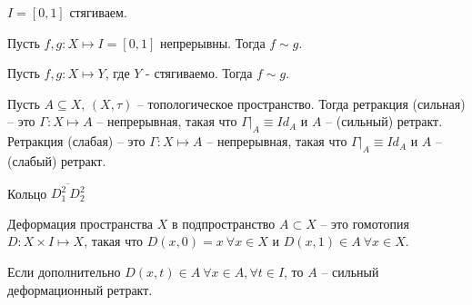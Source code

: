 \begin{exercise}
    $I = [0, 1]$ стягиваем.
\end{exercise}

\begin{statement}
    Пусть $f,g: X \mapsto I = [0, 1]$ непрерывны. Тогда $f \sim g$. 
\end{statement}

\begin{statement}
    Пусть $f,g: X \mapsto Y$, где $Y$ - стягиваемо. Тогда $f \sim g$. 
\end{statement}

\begin{definition}
    Пусть $A \subseteq X$, $(X, \tau)$ -- топологическое пространство. Тогда ретракция (сильная) -- это $\Gamma: X \mapsto A$ -- непрерывная, такая что $\Gamma|_A \equiv Id_A$ и $A$ -- (сильный) ретракт. Ретракция (слабая) -- это $\Gamma:X \mapsto A$ -- непрерывная, такая что $\Gamma|_A \equiv Id_A$ и $A$ -- (слабый) ретракт.    
\end{definition}

\begin{example}
    Кольцо $\overline{D_1^2 \ D_2^2}$
\end{example}

\begin{definition}
    Деформация пространства $X$ в подпространство $A \subset X$ -- это гомотопия $D:X\times I \mapsto X$, такая что $D(x, 0) = x\ \forall x \in X$ и $D(x, 1) \in A\ \forall x \in X$.  
\end{definition}

\begin{definition}
    Если дополнительно $D(x ,t) \in A\ \forall x \in A, \forall t \in I$, то $A$ -- сильный деформационный ретракт. 
\end{definition}